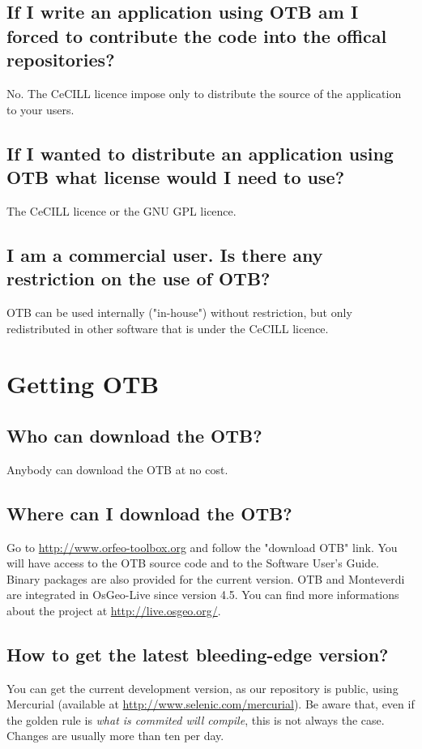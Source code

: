 \subsection{If I write an application using OTB am I forced to contribute the code into the offical repositories?}
No. The CeCILL licence impose only to distribute the source of the application to your users.

\subsection{If I wanted to distribute an application using OTB what license would I need to use?}
The CeCILL licence or the GNU GPL licence.

\subsection{I am a commercial user. Is there any restriction on the
  use of OTB?}
OTB can be used internally ("in-house") without restriction, but only
redistributed in other software that is under the CeCILL licence.

\section{Getting OTB}

\subsection{Who can download the OTB?}
Anybody can download the OTB at no cost.

\subsection{Where can I download the OTB?}
Go to \url{http://www.orfeo-toolbox.org}
 and follow the "download OTB" link. You will have access to the OTB
source code and to the Software User's Guide. Binary packages are also provided for the current version.
OTB and Monteverdi are integrated in OsGeo-Live since version 4.5.
You can find more informations about the project at \url{http://live.osgeo.org/}.

\subsection{How to get the latest bleeding-edge version?}\label{sec:FAQMercurial}
You can get the current development version, as our repository is public, using Mercurial (available at \url{http://www.selenic.com/mercurial}). Be aware that, even if the golden rule is {\em what is commited will compile}, this is not always the case. Changes are usually more than ten per day.


